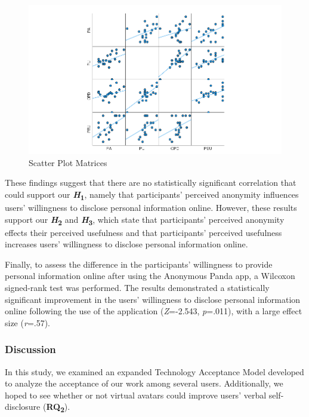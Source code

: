 \begin{figure}[!htb]
\includegraphics[width=\textwidth]{figures/scatterbox.png}
\centering
\caption{Scatter Plot Matrices}
\label{fig:scatterbox}
\end{figure}

These findings suggest that there are no statistically significant correlation that could support our \textbf{\textit{H}\textsubscript{1}}, namely that participants' perceived anonymity influences users' willingness to disclose personal information online. However, these results support our \textbf{\textit{H}\textsubscript{2}} and \textbf{\textit{H}\textsubscript{3}}, which state that participants' perceived anonymity effects their perceived usefulness and that participants' perceived usefulness increases users' willingness to disclose personal information online.

Finally, to assess the difference in the participants' willingness to provide personal information online after using the Anonymous Panda app, a Wilcoxon signed-rank test was performed. The results demonstrated a statistically significant improvement in the users' willingness to disclose personal information online following the use of the application (\textit{Z}=-2.543, \textit{p}=.011), with a large effect size (\textit{r}=.57).
 
\subsubsection{Discussion}
In this study, we examined an expanded Technology Acceptance Model developed to analyze the acceptance of our work among several users. Additionally, we hoped to see whether or not virtual avatars could improve users' verbal self-disclosure (\textbf{RQ\textsubscript{2}}).


